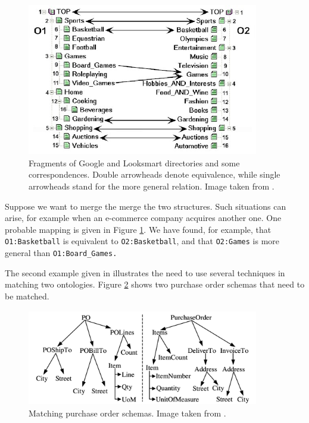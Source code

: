 \documentclass{fast_latex}
\begin{document}
\begin{figure}[h]
    \centering
        \includegraphics[width=101mm, height=67mm]{images/F2GoogleLooksmart.png}%
        \caption{Fragments of Google and Looksmart directories and some
correspondences. Double arrowheads denote equivalence, while single
arrowheads stand for the more general relation. Image taken from
\cite{giunchiglia2008evaluation}.}
    \label{fig:GoogleLooksmart}
\end{figure}

Suppose we want to merge the merge the two structures. Such situations
can arise, for example when an e-commerce company acquires another one.
One probable mapping is given in Figure \ref{fig:GoogleLooksmart}. We have found, for example,
that \texttt{O1:Basketball} is equivalent to
\texttt{O2:Basketball}, and that
\texttt{O2:Games} is more general than
\texttt{O1:Board\_Games.} 

The second example given in \cite{madhavan2001schema_matching} illustrates the
need to use several techniques in matching two ontologies. Figure \ref{fig:POSchemas}
shows two purchase order schemas that need to be matched. 

\begin{figure}[h]
    \centering
        \includegraphics [width=101mm, height=42mm]{images/F1POSchemas.png}%
        \caption{Matching purchase order schemas. Image taken from \cite{madhavan2001schema_matching}.}
    \label{fig:POSchemas}
\end{figure}
\end{document}
